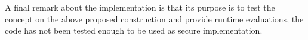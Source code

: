 
A final remark about the implementation is that its purpose is to test the concept on the above proposed construction and provide runtime evaluations, the code has not been tested enough to be used as secure implementation.




